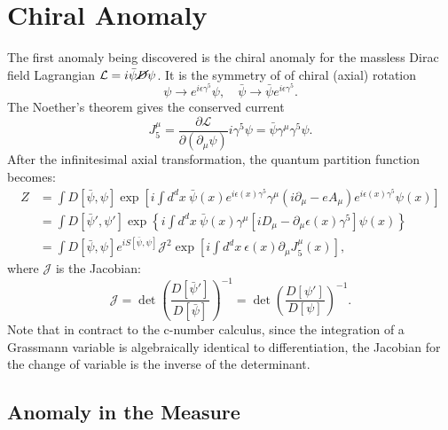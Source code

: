 \documentclass[aps,prb,superscriptaddress,nofootinbib]{revtex4}
\begin{document}
\section{Chiral Anomaly}
The first anomaly being discovered is the chiral anomaly for the massless Dirac field Lagrangian $\mathcal L = i\bar\psi \cancel D \psi$.
It is the symmetry of of chiral (axial) rotation 
\begin{equation}
	\psi \rightarrow e^{i\epsilon \gamma^5}\psi, \quad
	\bar\psi \rightarrow \bar\psi e^{i\epsilon \gamma^5}.
\end{equation}
The Noether's theorem gives the conserved current
\begin{equation}
	J^\mu_5 = \frac{\partial \mathcal L}{\partial(\partial_\mu \psi)} i\gamma^5\psi = \bar\psi \gamma^\mu \gamma^5\psi.
\end{equation}
After the infinitesimal axial transformation, the quantum partition function becomes:
\begin{equation}\label{eq:AN-CH-partition}
\begin{aligned}
	Z &= \int D[\bar\psi,\psi] \exp\left[i\int d^d x\ \bar\psi(x) e^{i\epsilon(x)\gamma^5}\gamma^\mu(i\partial_\mu - e A_\mu) e^{i\epsilon(x)\gamma^5}\psi(x) \right] \\
	&= \int D[\bar\psi',\psi'] \exp\left\{i\int d^d x\ \bar\psi(x) \gamma^\mu\left[iD_\mu-\partial_\mu\epsilon(x)\gamma^5\right] \psi(x) \right\} \\
	&= \int D[\bar\psi,\psi] e^{iS[\bar\psi,\psi]} \mathcal J^2 \exp\left[i \int d^d x\ \epsilon(x) \partial_\mu J_5^\mu(x) \right],
\end{aligned}
\end{equation}
where $\mathcal J$ is the Jacobian:
\begin{equation}
	\mathcal J = \det\left(\frac{D[\bar\psi']}{D[\bar\psi]}\right)^{-1}=\det\left(\frac{D[\psi']}{D[\psi]}\right)^{-1}.
\end{equation}
Note that in contract to the c-number calculus, since the integration of a Grassmann variable is algebraically identical to differentiation, the Jacobian for the change of variable is the inverse of the determinant.


\subsection{Anomaly in the Measure}
\end{document}
